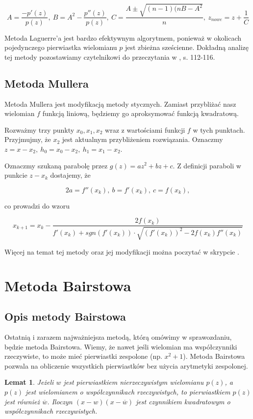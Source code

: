 \documentclass{article}
\newtheorem{lemat}{Lemat}
\begin{document}
$$ A = \frac{-p'(z)}{p(z)}, \ B = A^2 - \frac{p''(z)}{p(z)}, \ C = \frac{A \pm \sqrt{(n-1)(nB - A^2}}{n}, \ z_{nowe} = z + \frac{1}{C}$$ 

Metoda Laguerre'a jest bardzo efektywnym algorytmem, ponieważ w okolicach pojedynczego pierwiastka wielomianu $p$ jest zbieżna sześcienne. Dokładną analizę tej metody pozostawiamy czytelnikowi do przeczytania w \cite{kincaid}, s. 112-116.

\subsection{Metoda Mullera}

Metoda Mullera jest modyfikacją metody stycznych. Zamiast przybliżać nasz wielomian $f$ funkcją liniową, będziemy go aproksymować funkcją kwadratową.

Rozważmy trzy punkty $x_0, x_1, x_2$ wraz z wartościami funkcji $f$ w tych punktach. Przyjmujmy, że $x_2$ jest aktualnym przybliżeniem rozwiązania. Oznaczmy $z = x-x_2, \ h_0 = x_0 - x_2, \ h_1 = x_1-x_2$.

Oznaczmy szukaną parabolę przez $g(z) = az^2 + bz + c$. Z definicji paraboli w punkcie $z - x_k$ dostajemy, że 

$$2a = f''(x_k), \ b = f'(x_k), \ c = f(x_k),$$

co prowadzi do wzoru

$$x_{k+1} = x_k - \frac{2f(x_k)}{f'(x_k) + sgn(f'(x_k)) \cdot \sqrt{(f'(x_k))^2 - 2f(x_k)f''(x_k)}}$$

Więcej na temat tej metody oraz jej modyfikacji można poczytać w skrypcie \cite{tajewski}.


\section{Metoda Bairstowa}

\subsection{Opis metody Bairstowa}

Ostatnią i zarazem najważniejsza metodą, którą omówimy w sprawozdaniu, będzie metoda Bairstowa. Wiemy, że nawet jeśli wielomian ma współczynniki rzeczywiste, to może mieć pierwiastki zespolone (np. $x^2 + 1$). Metoda Bairstowa pozwala na obliczenie wszystkich pierwiastków bez użycia arytmetyki zespolonej.


\begin{lemat}
Jeżeli $w$ jest pierwiastkiem nierzeczywistym wielomianu $p(z)$, a $p(z)$ jest wielomianem o współczynnikach rzeczywistych, to pierwiastkiem $p(z)$ jest również $\overline{w}$. Iloczyn $(x-w)(x-\overline{w})$ jest czynnikiem kwadratowym o współczynnikach rzeczywistych.
\end{lemat}
\end{document}
